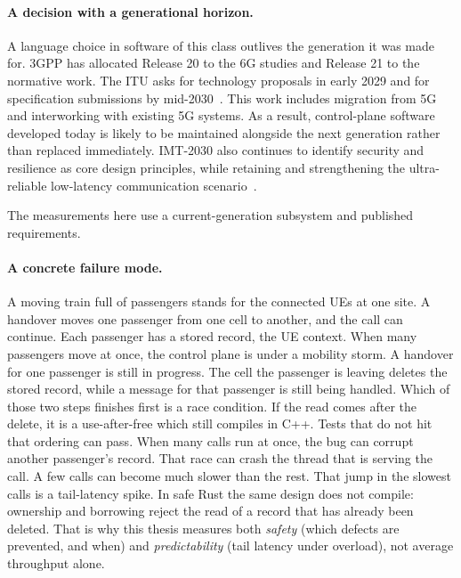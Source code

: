 \documentclass[english,oneside,a4paper,censored,csm,software-track-2020]{HYthesisML}
\begin{document}
\paragraph{A decision with a generational horizon.}
A language choice in software of this class outlives the generation it was made for.
3GPP has allocated Release 20 to the 6G studies and Release 21 to the normative work.
The ITU asks for technology proposals in early 2029 and for specification submissions by
mid-2030~\cite{3gpp2024road6g}. This work includes migration from 5G and interworking with 
existing 5G systems. As a result, control-plane software developed today is likely to be 
maintained alongside the next generation rather than replaced immediately. 
IMT-2030 also continues to identify security and resilience as core design principles, 
while retaining and strengthening the ultra-reliable low-latency communication scenario~\cite{itu2023imt2030}.

The measurements here use a current-generation subsystem and published requirements.

\paragraph{A concrete failure mode.}
A moving train full of passengers stands for the connected UEs at one site.
A handover moves one passenger from one cell to another, and the call can
continue. Each passenger has a stored record, the UE context. When many
passengers move at once, the control plane is under a mobility storm. A
handover for one passenger is still in progress. The cell the passenger is
leaving deletes the stored record, while a message for that passenger is still
being handled. Which of those two steps finishes first is a race condition. If
the read comes after the delete, it is a use-after-free which still compiles in C++. Tests that do not hit that ordering can pass.
When many calls run at once, the bug can corrupt another passenger's record.
That race can crash the thread that is serving the call. A few calls can
become much slower than the rest. That jump in the slowest calls is a
tail-latency spike. In safe
Rust the same design does not compile: ownership and borrowing reject the read
of a record that has already been deleted. That is why this thesis measures
both \emph{safety} (which defects are prevented, and when) and
\emph{predictability} (tail latency under overload), not average throughput
alone.
\end{document}
